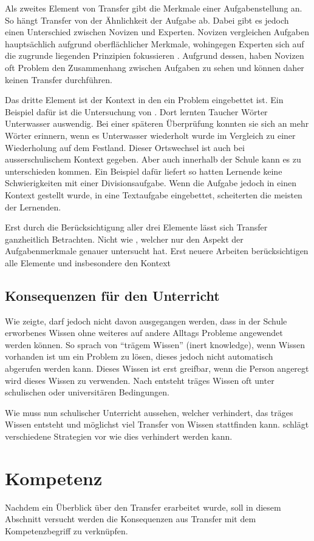 Als zweites Element von Transfer gibt \citeauthor{Marini1995} die Merkmale einer Aufgabenstellung an. So hängt Transfer von der Ähnlichkeit der Aufgabe ab. Dabei gibt es jedoch einen Unterschied zwischen Novizen und Experten. Novizen vergleichen Aufgaben hauptsächlich aufgrund oberflächlicher Merkmale, wohingegen Experten sich auf die zugrunde liegenden Prinzipien fokussieren \citep[s. S. 279]{Marini1995}. Aufgrund dessen, haben Novizen oft Problem den Zusammenhang zwischen Aufgaben zu sehen und können daher keinen Transfer durchführen.

Das dritte Element ist der Kontext in den ein Problem eingebettet ist. Ein Beispiel dafür ist die Untersuchung von \citet{Godden1975}. Dort lernten Taucher Wörter Unterwasser auswendig. Bei einer späteren Überprüfung konnten sie sich an mehr Wörter erinnern, wenn es Unterwasser wiederholt wurde im Vergleich zu einer Wiederholung auf dem Festland. Dieser Ortswechsel ist auch bei ausserschulischem Kontext gegeben. Aber auch innerhalb der Schule kann es zu unterschieden kommen. Ein Beispiel dafür liefert \citet{Schoenfeld1988} so hatten Lernende keine Schwierigkeiten mit einer Divisionsaufgabe. Wenn die Aufgabe jedoch in einen Kontext gestellt wurde, in eine Textaufgabe eingebettet, scheiterten die meisten der Lernenden. 

Erst durch die Berücksichtigung aller drei Elemente lässt sich Transfer ganzheitlich Betrachten. Nicht wie  \citet{Woodworth1901}, welcher nur den Aspekt der Aufgabenmerkmale genauer untersucht hat. Erst neuere Arbeiten berücksichtigen alle Elemente und insbesondere den Kontext \citep{Lobato2002a, Detterman1993, Greeno1996}

\subsection{Konsequenzen für den Unterricht}

Wie \citet{claxton1990} zeigte, darf jedoch nicht davon ausgegangen werden, dass in der Schule erworbenes Wissen ohne weiteres auf andere Alltags Probleme angewendet werden können. So sprach \citet{Whitehead1929} von "`trägem Wissen"' (inert knowledge), wenn Wissen vorhanden ist um ein Problem zu lösen, dieses jedoch nicht automatisch abgerufen werden kann. Dieses Wissen ist erst greifbar, wenn die Person angeregt wird dieses Wissen zu verwenden. Nach \citet{Whitehead1929} entsteht träges Wissen oft unter schulischen oder universitären Bedingungen. 

Wie muss nun schulischer Unterricht aussehen, welcher verhindert, das träges Wissen entsteht und möglichst viel Transfer von Wissen stattfinden kann. \citet[s. S. 316ff]{Mietzel2007} schlägt verschiedene Strategien vor wie dies verhindert werden kann.

\section{Kompetenz}

Nachdem ein Überblick über den Transfer erarbeitet wurde, soll in diesem Abschnitt versucht werden die Konsequenzen aus Transfer mit dem Kompetenzbegriff zu verknüpfen.

